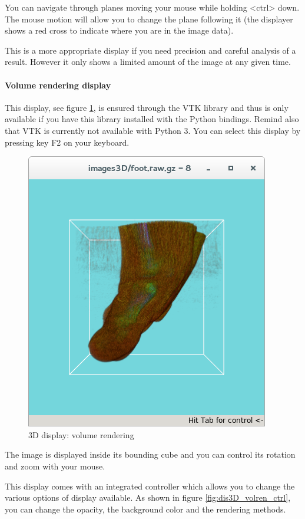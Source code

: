 \documentclass[a4paper,10pt,oneside]{article}
\begin{document}
You can navigate through planes moving your mouse while holding <ctrl> down.
The mouse motion will allow you to change the plane following it (the displayer
shows a red cross to indicate where you are in the image data).

This is a more appropriate display if you need precision and careful
analysis of a result. However it only shows a limited amount of the
image at any given time.

\paragraph{Volume rendering display}

This display, see figure \ref{fig:dis3D_volren}, is ensured through the VTK
library and thus is only available if you have this library installed with
the Python bindings. Remind also that VTK is currently not available with Python 3. 
You can select this display by pressing key F2 on your keyboard.

\begin{figure}
\centering
\includegraphics[scale=0.5]{images/dis3D_volren.png}
\caption{3D display: volume rendering}
\label{fig:dis3D_volren}
\end{figure}

The image is displayed inside its bounding cube and you can control its rotation
and zoom with your mouse.

This display comes with an integrated controller which allows you to change
the various options of display available. As shown in figure \ref{fig:dis3D_volren_ctrl},
you can change the opacity, the background color and the rendering methods.
\end{document}
